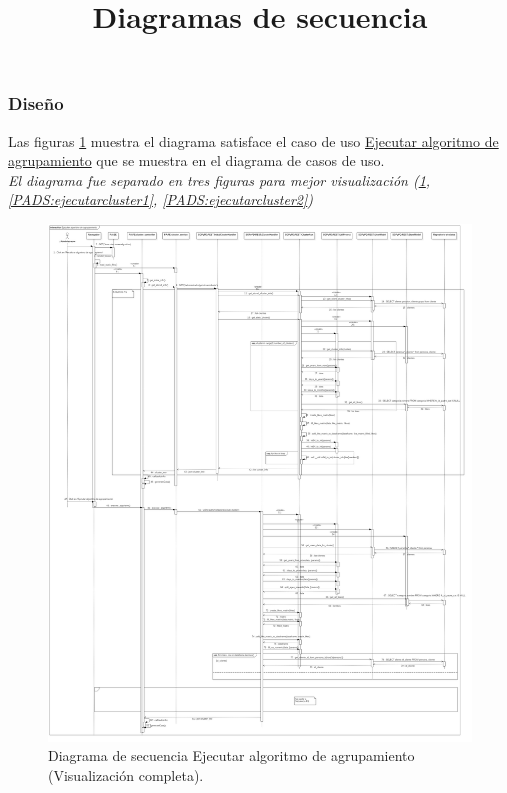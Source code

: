 \subsubsection{Diseño}

\title{\textbf{Diagramas de secuencia \\}}
Las figuras \ref{PADS:ejecutarcluster} muestra el diagrama satisface el caso de uso \hyperlink{casosdeusoPA}{Ejecutar algoritmo de agrupamiento} que se muestra en el diagrama de casos de uso. \\ \textit{El diagrama fue separado en tres figuras para mejor visualización (\ref{PADS:ejecutarcluster}, \ref{PADS:ejecutarcluster1}, \ref{PADS:ejecutarcluster2})}
\FloatBarrier
\begin{figure}[htbp!]
		\centering
			\includegraphics[width=1 \textwidth]{imagenes/DSRuben/CLUSTER}
		\caption{Diagrama de secuencia Ejecutar algoritmo de agrupamiento (Visualización completa).}
		\label{PADS:ejecutarcluster}
\end{figure}
\FloatBarrier

